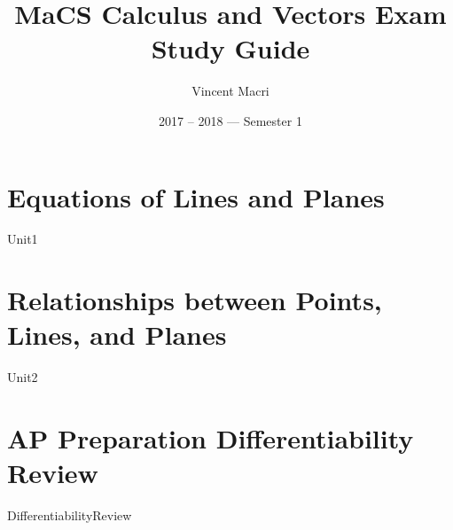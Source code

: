 \documentclass[letterpaper,12pt]{report}
\title{MaCS Calculus and Vectors Exam Study Guide}
\author{Vincent Macri}
\date{2017 -- 2018 --- Semester 1}
\begin{document}
	\maketitle
	\clearpage
	\tableofcontents
	\clearpage

	\part{Equations of Lines and Planes}
		{Unit1}
	\part{Relationships between Points, Lines, and Planes}
		{Unit2}
	\part*{AP Preparation Differentiability Review}
		{DifferentiabilityReview}
	
\end{document}

